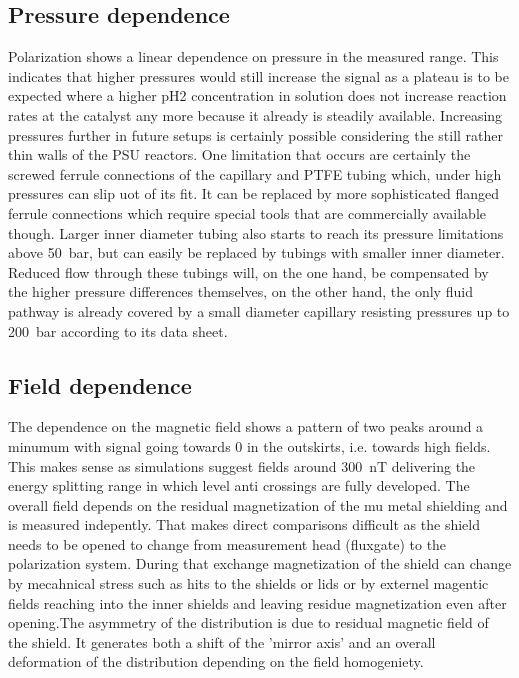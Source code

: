         \subsection{Pressure dependence}
            Polarization shows a linear dependence on pressure in the measured range. This indicates that higher pressures would still increase the signal as a plateau is to be expected where a higher pH2 concentration in solution does not increase reaction rates at the catalyst any more because it already is steadily available. Increasing pressures further in future setups is certainly possible considering the still rather thin walls of the PSU reactors. One limitation that occurs are certainly the screwed ferrule connections of the capillary and PTFE tubing which, under high pressures can slip uot of its fit. It can be replaced by more sophisticated flanged ferrule connections which require special tools that are commercially available though. Larger inner diameter tubing also starts to reach its pressure limitations above \SI{50}{\bar}, but can easily be replaced by tubings with smaller inner diameter. Reduced flow through these tubings will, on the one hand, be compensated by the higher pressure differences themselves, on the other hand, the only fluid pathway is already covered by a small diameter capillary resisting pressures up to \SI{200}{\bar} according to its data sheet.
        \subsection{Field dependence}
            The dependence on the magnetic field shows a pattern of two peaks around a minumum with signal going towards 0 in the outskirts, i.e. towards high fields. This makes sense as simulations suggest fields around \SI{300}{\nano\tesla} delivering the energy splitting range in which level anti crossings are fully developed. The overall field depends on the residual magnetization of the mu metal shielding and is measured indepently. That makes direct comparisons difficult as the shield needs to be opened to change from measurement head (fluxgate) to the polarization system. During that exchange magnetization of the shield can change by mecahnical stress such as hits to the shields or lids or by externel magentic fields reaching into the inner shields and leaving residue magnetization even after opening.The asymmetry of the distribution is due to residual magnetic field of the shield. It generates both a shift of the 'mirror axis' and an overall deformation of the distribution depending on the field homogeniety.


